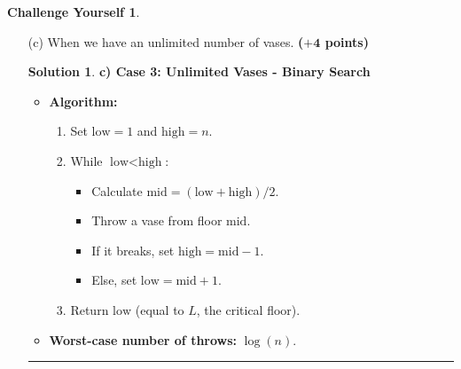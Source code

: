 \documentclass{article}
\theoremstyle{definition}
\newtheorem*{challenge}{Challenge Yourself}
\def\fline{\rule{0.75\linewidth}{0.5pt}}
\newcommand{\finishline}{\begin{center}\fline\end{center}}
\newtheorem*{solution*}{Solution}
\newenvironment{solution}{\begin{solution*}}{{\finishline} \end{solution*}}
\newcommand{\grade}[1]{\hfill{\textbf{($\mathbf{#1}$ points)}}}
\begin{document}
\begin{challenge}
\begin{enumerate}
	\item[(c)] When we have an unlimited number of vases.  \grade{+4} 
	
	
    	\begin{solution}
		\textbf{c) Case 3: Unlimited Vases - Binary Search}
		\begin{itemize}
		    \item \textbf{Algorithm:}
		    \begin{enumerate}
			\item Set \( \text{low} = 1 \) and \( \text{high} = n \).
			\item While \( \text{low} < \text{high} \):
			\begin{itemize}
			    \item Calculate \( \text{mid} = (\text{low} + \text{high}) / 2 \).
			    \item Throw a vase from floor \( \text{mid} \).
			    \item If it breaks, set \( \text{high} = \text{mid} - 1 \).
			    \item Else, set \( \text{low} = \text{mid} + 1 \).
			\end{itemize}
			\item Return \( \text{low} \) (equal to \( L \), the critical floor).
		    \end{enumerate}
		    \item \textbf{Worst-case number of throws:} \( \log(n) \).
		\end{itemize}
	\end{solution}


	\end{enumerate}
\end{challenge}
\end{document}
